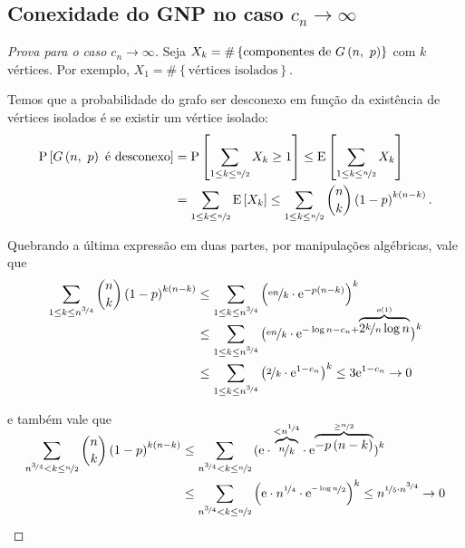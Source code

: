 \subsection{Conexidade do GNP no caso $c_n\rightarrow\infty$}
\begin{proof}[Prova para o caso $c_n\rightarrow\infty$]
  Seja $X_k=\#\left\{\text{componentes de }G\left(n,\ p\vphantom{1j}\right)\right\}$ com $k$ vértices. Por exemplo, $X_1=\#\left\{\text{vértices isolados}\right\}$.

  Temos que a probabilidade do grafo ser desconexo em função da existência de vértices isolados é se existir um vértice isolado:
  \vspace*{-\baselineskip}
  \begin{align*}
    \mathrm{P}\left[G\left(n,\ p\vphantom{1j}\right)\text{ é desconexo}\vphantom{1j}\right]
      &=    \mathrm{P}\left[\sum_{1\leq k\leq\nicefrac{n}{2}}X_k\geq 1\vphantom{1j}\right]
      \leq  \mathrm{E}\left[\sum_{1\leq k\leq\nicefrac{n}{2}}\vphantom{1j}X_k\right]                   \\
      &=    \sum_{1\leq k\leq\nicefrac{n}{2}}\mathrm{E}\left[X_k\vphantom{1j}\right]
      \leq  \sum_{1\leq k\leq\nicefrac{n}{2}}\binom{n}{k}\left(1-p\vphantom{1j}\right)^{k\left(n-k\vphantom{1j}\right)}.
  \end{align*}

  Quebrando a última expressão em duas partes, por manipulações algébricas, vale que
  \begin{align*}
    \sum_{1\leq k\leq n^{\nicefrac{3}{4}}}\binom{n}{k}\left(1-p\vphantom{1j}\right)^{k\left(n-k\vphantom{1j}\right)}
      &\leq \sum_{1\leq k\leq n^{\nicefrac{3}{4}}}\left(\nicefrac{\mathrm{e} n}{k}\cdot\mathrm{e}^{-p\left(n-k\vphantom{1j}\right)}\vphantom{1j}\right)^k  \\
      &\leq \sum_{1\leq k\leq n^{\nicefrac{3}{4}}}
              \left(\nicefrac{\mathrm{e} n}{k}\cdot\mathrm{e}^{-\log n-c_n+\smash{\overbrace{2\nicefrac{k}{n}\log n}^{o(1)}}}\vphantom{1j}\right)^k \\
      &\leq \sum_{1\leq k\leq n^{\nicefrac{3}{4}}}\left(\nicefrac{2}{k}\cdot\mathrm{e}^{1-c_n}\vphantom{1j}\right)^k
      \leq  3\mathrm{e}^{1-c_n} 
      \rightarrow 0
  \end{align*}

  e também vale que
  \begin{align*}
    \sum_{n^{\nicefrac{3}{4}}<k\leq\nicefrac{n}{2}}\binom{n}{k}\left(1-p\vphantom{1j}\right)^{k\left(n-k\vphantom{1j}\right)}
      &\leq \sum_{n^{\nicefrac{3}{4}}<k\leq\nicefrac{n}{2}}
              \left(\mathrm{e}\cdot\smash{\overbrace{\nicefrac{n}{k}}^{<n^{\nicefrac{1}{4}}}}\cdot
              \mathrm{e}^{\smash{\overbrace{-p\left(n-k\vphantom{1j}\right)}^{\geq\nicefrac{n}{2}}}}\vphantom{1j}\right)^k                             \\
      &\leq \sum_{n^{\nicefrac{3}{4}}<k\leq\nicefrac{n}{2}}\left(\mathrm{e}\cdot n^{\nicefrac{1}{4}}\cdot\mathrm{e}^{\nicefrac{-\log n}{2}}\vphantom{1j}\right)^k
      \leq  n^{\nicefrac{1}{5}\cdot n^{\nicefrac{3}{4}}}
      \rightarrow 0
  \end{align*}


\end{proof}
